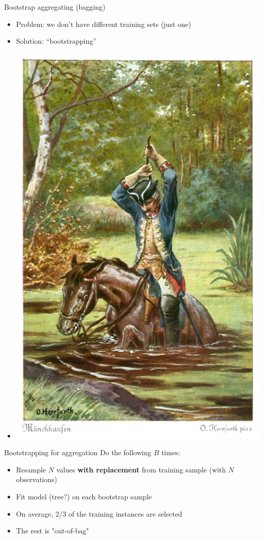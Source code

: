 \documentclass[xcolor=table,aspectratio=169]{beamer}
\begin{document}
\begin{frame}{Bootstrap aggregating (bagging)}
	
	\begin{itemize}
		\item Problem: we don't have different training sets (just one)
		\item Solution: ``bootstrapping''
		\item[] \includegraphics[height=0.5\textheight]{pics/munchausen.jpg}
	\end{itemize}

\end{frame}

\begin{frame}{Bootstrapping for aggregation}
	Do the following $B$ times:
	\begin{itemize}
		\item Resample $N$ values \textbf{with replacement} from training sample (with $N$ observations)
		\item Fit model (tree?) on each bootstrap sample
		\item On average, 2/3 of the training instances are selected
		\item The rest is "out-of-bag"
	\end{itemize}
\end{frame}
\end{document}
